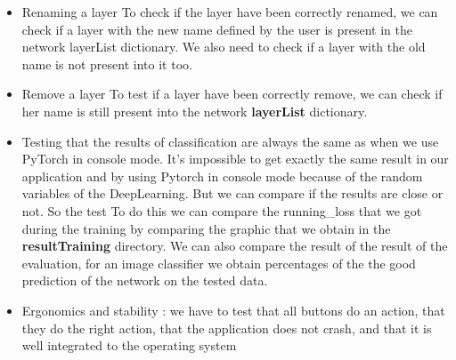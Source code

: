 \begin{itemize}
\item Renaming a layer\newline
To check if the layer have been correctly renamed, we can check if a layer with the new name defined by the user is present in the network layerList dictionary.
We also need to check if a layer with the old name is not present into it too.

\item Remove a layer \newline
To test if a layer have been correctly remove, we can check if her name is still present into the network \textbf{layerList} dictionary.

\item Testing that the results of classification are always the same as when we use PyTorch in console mode.
It's impossible to get exactly the same result in our application and by using Pytorch in console mode because of the random variables of the DeepLearning. But we can compare if the results are close or not. So the test 
To do this we can compare the running\_loss that we got during the training by comparing the graphic that we obtain in the \textbf{resultTraining} directory. 
We can also compare the result of the result of the evaluation, for an image classifier we obtain percentages of the the good prediction of the network on the tested data.

\item Ergonomics and stability : we have to test that all buttons do an action, that they do the right action, that the application does not crash, and that it is well integrated to the operating system
\end{itemize}

